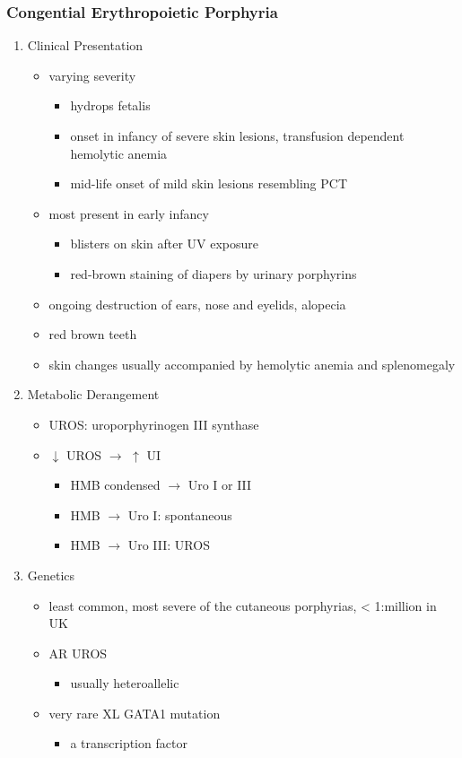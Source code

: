 \documentclass[12pt]{scrartcl}
\begin{document}
\subsubsection{Congential Erythropoietic Porphyria}
\label{sec:orgd1b90cb}
\begin{enumerate}
\item Clinical Presentation
\label{sec:org657535d}
\begin{itemize}
\item varying severity
\begin{itemize}
\item hydrops fetalis
\item onset in infancy of severe skin lesions, transfusion dependent
hemolytic anemia
\item mid-life onset of mild skin lesions resembling PCT
\end{itemize}
\item most present in early infancy
\begin{itemize}
\item blisters on skin after UV exposure
\item red-brown staining of diapers by urinary porphyrins
\end{itemize}
\item ongoing destruction of ears, nose and eyelids, alopecia
\item red brown teeth
\item skin changes usually accompanied by hemolytic anemia and splenomegaly
\end{itemize}
\item Metabolic Derangement
\label{sec:orgb2e7a7b}
\begin{itemize}
\item UROS: uroporphyrinogen III synthase
\item \(\downarrow\) UROS \(\to\) \(\uparrow\) UI
\begin{itemize}
\item HMB condensed \(\to\) Uro I or III
\item HMB \(\rightarrow\) Uro I: spontaneous
\item HMB \(\rightarrow\) Uro III: UROS
\end{itemize}
\end{itemize}
\item Genetics
\label{sec:org1fdfbd3}
\begin{itemize}
\item least common, most severe of the cutaneous porphyrias, < 1:million in UK
\item AR UROS
\begin{itemize}
\item usually heteroallelic
\end{itemize}
\item very rare XL GATA1 mutation
\begin{itemize}
\item a transcription factor
\end{itemize}
\end{itemize}


\end{enumerate}
\end{document}

